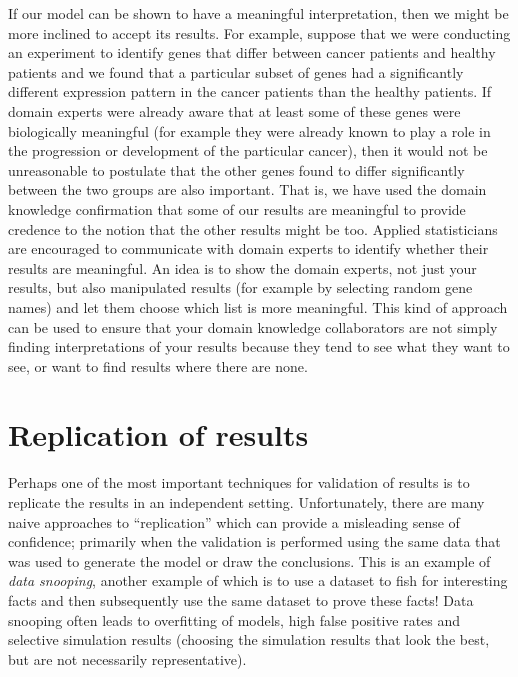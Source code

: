 If our model can be shown to have a meaningful interpretation, then we might be more inclined to accept its results. For example, suppose that we were conducting an experiment to identify genes that differ between cancer patients and healthy patients and we found that a particular subset of genes had a significantly different expression pattern in the cancer patients than the healthy patients. If domain experts were already aware that at least some of these genes were biologically meaningful (for example they were already known to play a role in the progression or development of the particular cancer), then it would not be unreasonable to postulate that the other genes found to differ significantly between the two groups are also important. That is, we have used the domain knowledge confirmation that some of our results are meaningful to provide credence to the notion that the other results might be too. Applied statisticians are encouraged to communicate with domain experts to identify whether their results are meaningful. An idea is to show the domain experts, not just your results, but also manipulated results (for example by selecting random gene names) and let them choose which list is more meaningful. This kind of approach can be used to ensure that your domain knowledge collaborators are not simply finding interpretations of your results because they tend to see what they want to see, or want to find results where there are none.

\section{Replication of results}

Perhaps one of the most important techniques for validation of results is to replicate the results in an independent setting. Unfortunately, there are many naive approaches to ``replication'' which can provide a misleading sense of confidence; primarily when the validation is performed using the same data that was used to generate the model or draw the conclusions. This is an example of \textit{data snooping}, another example of which is to use a dataset to fish for interesting facts and then subsequently use the same dataset to prove these facts! Data snooping often leads to overfitting of models, high false positive rates and selective simulation results (choosing the simulation results that look the best, but are not necessarily representative).

